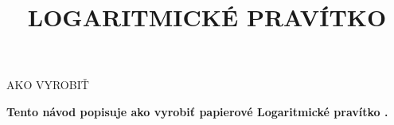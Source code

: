 
\usepackage{polyglossia}
\setdefaultlanguage{slovak}
\newcommand{\makefulltitle}{Ako vyrobiť Logaritmické pravítko }



\title{\fontsize{60}{60}\selectfont LOGARITMICKÉ PRAVÍTKO}
\preauthor{}\postauthor{}\author{}
\predate{}\postdate{}\date{}


  \begin{center}
    \headingfont\fontsize{20}{20}\selectfont AKO VYROBIŤ
  \end{center}

  {\let\newpage\relax\maketitle}%
  \nosection{}
  \large\textbf{\makeperex Tento návod popisuje ako vyrobiť papierové Logaritmické pravítko \modelname.}

